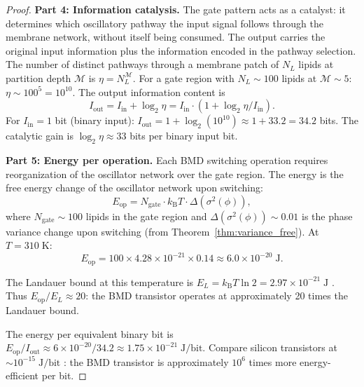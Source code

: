 \documentclass[twocolumn,10pt]{article}
\theoremstyle{remark}
\newcommand{\kB}{k_{\mathrm{B}}}
\newcommand{\Depth}{\mathcal{M}}
\begin{document}
\begin{proof}
\textbf{Part 4: Information catalysis.}
The gate pattern acts as a catalyst: it determines which oscillatory pathway the input signal follows through the membrane network, without itself being consumed. The output carries the original input information plus the information encoded in the pathway selection. The number of distinct pathways through a membrane patch of $N_L$ lipids at partition depth $\Depth$ is $\eta = N_L^{\Depth}$. For a gate region with $N_L \sim 100$ lipids at $\Depth \sim 5$: $\eta \sim 100^5 = 10^{10}$. The output information content is
\begin{equation}
I_{\mathrm{out}} = I_{\mathrm{in}} + \log_2 \eta = I_{\mathrm{in}} \cdot (1 + \log_2 \eta / I_{\mathrm{in}}).
\end{equation}
For $I_{\mathrm{in}} = 1$ bit (binary input): $I_{\mathrm{out}} = 1 + \log_2(10^{10}) \approx 1 + 33.2 = 34.2$ bits. The catalytic gain is $\log_2 \eta \approx 33$ bits per binary input bit.

\textbf{Part 5: Energy per operation.}
Each BMD switching operation requires reorganization of the oscillator network over the gate region. The energy is the free energy change of the oscillator network upon switching:
\begin{equation}
E_{\mathrm{op}} = N_{\mathrm{gate}} \cdot \kB T \cdot \Delta(\sigma^2(\phi)),
\end{equation}
where $N_{\mathrm{gate}} \sim 100$ lipids in the gate region and $\Delta(\sigma^2(\phi)) \sim 0.01$ is the phase variance change upon switching (from Theorem~\ref{thm:variance_free}). At $T = 310\;\mathrm{K}$:
\begin{equation}
E_{\mathrm{op}} = 100 \times 4.28 \times 10^{-21} \times 0.14 \approx 6.0 \times 10^{-20}\;\mathrm{J}.
\label{eq:energy_op}
\end{equation}

The Landauer bound at this temperature is $E_L = \kB T \ln 2 = 2.97 \times 10^{-21}\;\mathrm{J}$ \cite{landauer1961}. Thus $E_{\mathrm{op}} / E_L \approx 20$: the BMD transistor operates at approximately 20 times the Landauer bound.

The energy per equivalent binary bit is $E_{\mathrm{op}} / I_{\mathrm{out}} \approx 6 \times 10^{-20} / 34.2 \approx 1.75 \times 10^{-21}\;\mathrm{J/bit}$. Compare silicon transistors at $\sim 10^{-15}\;\mathrm{J/bit}$ \cite{landauer1961,bennett1982}: the BMD transistor is approximately $10^6$ times more energy-efficient per bit.
\end{proof}
\end{document}
